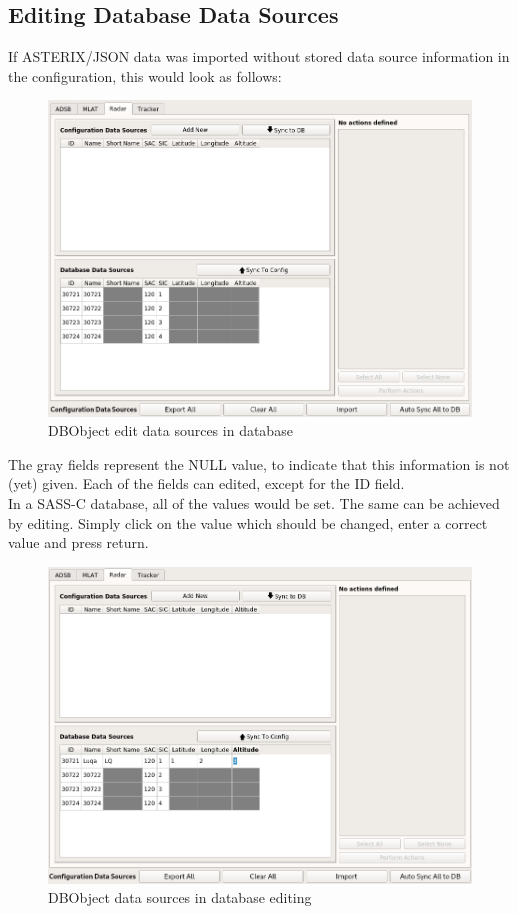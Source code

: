 \subsection{Editing Database Data Sources}

If ASTERIX/JSON data was imported without stored data source information in the configuration, this would look as follows:

\begin{figure}[H]
  \center
    \includegraphics[width=16cm,frame]{figures/manage_data_sources_edit_ds_db.png}
  \caption{DBObject edit data sources in database}
\end{figure}

The gray fields represent the NULL value, to indicate that this information is not (yet) given. Each of the fields can edited, except for the ID field. \\

In a SASS-C database, all of the values would be set. The same can be achieved by editing. Simply click on the value which should be changed, enter a correct value and press return. \\

\begin{figure}[H]
  \center
    \includegraphics[width=16cm,frame]{figures/manage_data_sources_edit_ds_db2.png}
  \caption{DBObject data sources in database editing}
\end{figure}

